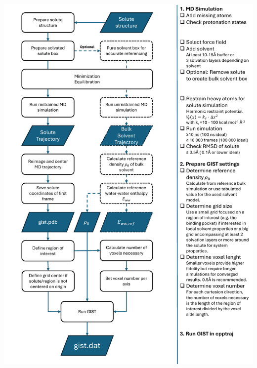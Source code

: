 \documentclass[9pt,tutorial]{livecoms}
\begin{document}
\begin{Checklists*}
	\includegraphics[width=0.9\linewidth,page=1]{figures/flowchart_GIST.pdf}
\end{Checklists*}
	\pagebreak
\end{document}
